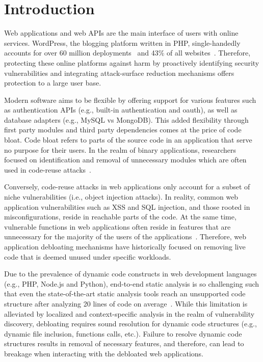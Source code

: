 \section{Introduction}

Web applications and web APIs are the main interface of users with online services. 
WordPress, the blogging platform written in PHP, single-handedly accounts for over 60 million deployments~\cite{wpstatsbuildwith} and 43\% of all websites~\cite{wpstatsw3techs}. 
Therefore, protecting these online platforms against harm by proactively identifying security vulnerabilities and integrating attack-surface reduction mechanisms offers protection to a large user base. 

Modern software aims to be flexible by offering support for various features such as authentication APIs (e.g., built-in authentication and oauth), as well as database adapters (e.g., MySQL vs MongoDB). 
This added flexibility through first party modules and third party dependencies comes at the price of code bloat. 
Code bloat refers to parts of the source code in an application that serve no purpose for their users. 
In the realm of binary applications, researchers focused on identification and removal of unnecessary modules which are often used in code-reuse attacks~\cite{redini2019b, quach2018debloating, 255308}. 

Conversely, code-reuse attacks in web applications only account for a subset of niche vulnerabilities (i.e., object injection attacks). 
In reality, common web application vulnerabilities such as XSS and SQL injection, and those rooted in misconfigurations, reside in reachable parts of the code. 
At the same time, vulnerable functions in web applications often reside in features that are unnecessary for the majority of the users of the applications~\cite{azad2019less}. 
Therefore, web application debloating mechanisms have historically focused on removing live code that is deemed unused under specific workloads. 

Due to the prevalence of dynamic code constructs in web development languages (e.g., PHP, Node.js and Python), end-to-end static analysis is so challenging such that even the state-of-the-art static analysis tools reach an unsupported code structure after analyzing 20 lines of code on average~\cite{altestability}. 
While this limitation is alleviated by localized and context-specific analysis in the realm of vulnerability discovery, debloating requires sound resolution for dynamic code structures (e.g., dynamic file inclusion, functions calls, etc.). 
Failure to resolve dynamic code structures results in removal of necessary features, and therefore, can lead to breakage when interacting with the debloated web applications.

